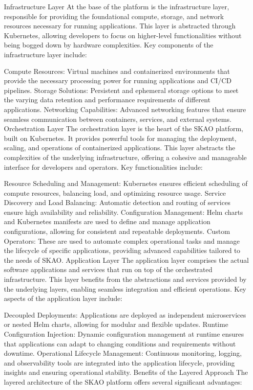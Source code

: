 \documentclass[a4paper]{spie}  %
\begin{document}
Infrastructure Layer
At the base of the platform is the infrastructure layer, responsible for providing the foundational compute, storage, and network resources necessary for running applications. This layer is abstracted through Kubernetes, allowing developers to focus on higher-level functionalities without being bogged down by hardware complexities. Key components of the infrastructure layer include:

Compute Resources: Virtual machines and containerized environments that provide the necessary processing power for running applications and CI/CD pipelines.
Storage Solutions: Persistent and ephemeral storage options to meet the varying data retention and performance requirements of different applications.
Networking Capabilities: Advanced networking features that ensure seamless communication between containers, services, and external systems.
Orchestration Layer
The orchestration layer is the heart of the SKAO platform, built on Kubernetes. It provides powerful tools for managing the deployment, scaling, and operations of containerized applications. This layer abstracts the complexities of the underlying infrastructure, offering a cohesive and manageable interface for developers and operators. Key functionalities include:

Resource Scheduling and Management: Kubernetes ensures efficient scheduling of compute resources, balancing load, and optimizing resource usage.
Service Discovery and Load Balancing: Automatic detection and routing of services ensure high availability and reliability.
Configuration Management: Helm charts and Kubernetes manifests are used to define and manage application configurations, allowing for consistent and repeatable deployments.
Custom Operators: These are used to automate complex operational tasks and manage the lifecycle of specific applications, providing advanced capabilities tailored to the needs of SKAO.
Application Layer
The application layer comprises the actual software applications and services that run on top of the orchestrated infrastructure. This layer benefits from the abstractions and services provided by the underlying layers, enabling seamless integration and efficient operations. Key aspects of the application layer include:

Decoupled Deployments: Applications are deployed as independent microservices or nested Helm charts, allowing for modular and flexible updates.
Runtime Configuration Injection: Dynamic configuration management at runtime ensures that applications can adapt to changing conditions and requirements without downtime.
Operational Lifecycle Management: Continuous monitoring, logging, and observability tools are integrated into the application lifecycle, providing insights and ensuring operational stability.
Benefits of the Layered Approach
The layered architecture of the SKAO platform offers several significant advantages:
\end{document}

